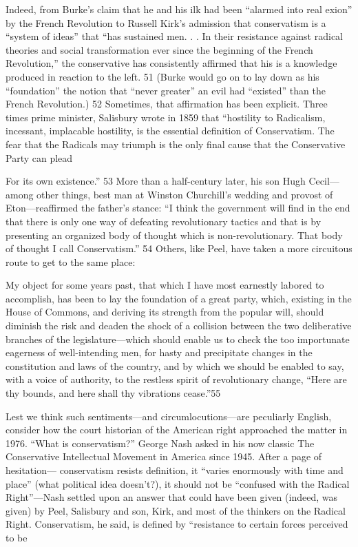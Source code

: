  \par 
Indeed, from Burke’s claim that he and his ilk had been “alarmed into real exion” by the French Revolution to Russell Kirk’s admission that conservatism is a “system of ideas” that “has sustained men. . . In their resistance against radical theories and social transformation ever since the beginning of the French Revolution,” the conservative has consistently affirmed that his is a knowledge produced in reaction to the left. {\color{blue}51} (Burke would go on to lay down as his “foundation” the notion that “never greater” an evil had “existed” than the French Revolution.) {\color{blue}52} Sometimes, that affirmation has been explicit. Three times prime minister, Salisbury wrote in 1859 that “hostility to Radicalism, incessant, implacable hostility, is the essential definition of Conservatism. The fear that the Radicals may triumph is the only final cause that the Conservative Party can plead
 \par 
For its own existence.” {\color{blue}53} More than a half-century later, his son Hugh Cecil—among other things, best man at Winston Churchill’s wedding and provost of Eton—reaffirmed the father’s stance: “I think the government will find in the end that there is only one way of defeating revolutionary tactics and that is by presenting an organized body of thought which is non-revolutionary. That body of thought I call Conservatism.” {\color{blue}54} Others, like Peel, have taken a more circuitous route to get to the same place:
 \par 
My object for some years past, that which I have most earnestly labored to accomplish, has been to lay the foundation of a great party, which, existing in the House of Commons, and deriving its strength from the popular will, should diminish the risk and deaden the shock of a collision between the two deliberative branches of the legislature—which should enable us to check the too importunate eagerness of well-intending men, for hasty and precipitate changes in the constitution and laws of the country, and by which we should be enabled to say, with a voice of authority, to the restless spirit of revolutionary change, “Here are thy bounds, and here shall thy vibrations cease.”{\color{blue}55}
 \par 
Lest we think such sentiments—and circumlocutions—are peculiarly English, consider how the court historian of the American right approached the matter in 1976. “What is conservatism?” George Nash asked in his now classic The Conservative Intellectual Movement in America since 1945. After a page of hesitation— conservatism resists definition, it “varies enormously with time and place” (what political idea doesn’t?), it should not be “confused with the Radical Right”—Nash settled upon an answer that could have been given (indeed, was given) by Peel, Salisbury and son, Kirk, and most of the thinkers on the Radical Right. Conservatism, he said, is defined by “resistance to certain forces perceived to be
